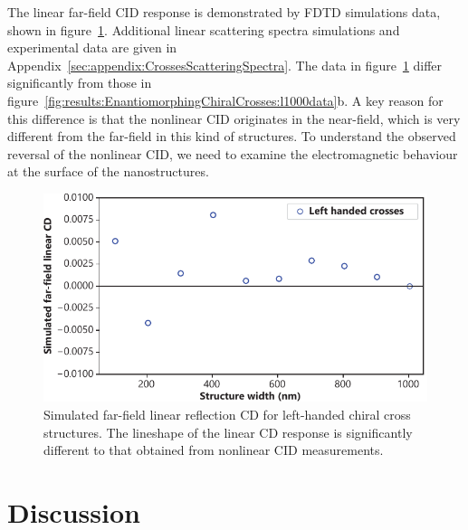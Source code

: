 The linear far-field CID response is demonstrated by FDTD simulations data, shown in figure~\ref{fig:results:EnantiomorphingChiralCrosses:reflectionsim}. Additional linear scattering spectra simulations and experimental data are given in Appendix~\ref{sec:appendix:CrossesScatteringSpectra}. The data in figure~\ref{fig:results:EnantiomorphingChiralCrosses:reflectionsim} differ significantly from those in figure~\ref{fig:results:EnantiomorphingChiralCrosses:l1000data}b. A key reason for this difference is that the nonlinear CID originates in the near-field, which is very different from the far-field in this kind of structures. To understand the observed reversal of the nonlinear CID, we need to examine the electromagnetic behaviour at the surface of the nanostructures. 

\begin{figure}[htb!]	
    \centering	
    \includegraphics[scale=1]{./figures/results/EnantiomorphingChiralCrosses/reflection_sim.pdf}
    \caption{\label{fig:results:EnantiomorphingChiralCrosses:reflectionsim}
    Simulated far-field linear reflection CD for left-handed chiral cross structures. The lineshape of the linear CD response is significantly different to that obtained from nonlinear CID measurements.}	
\end{figure}

\section{Discussion}\label{sec:results:EnantiomorphingChiralCrosses:discussion}

